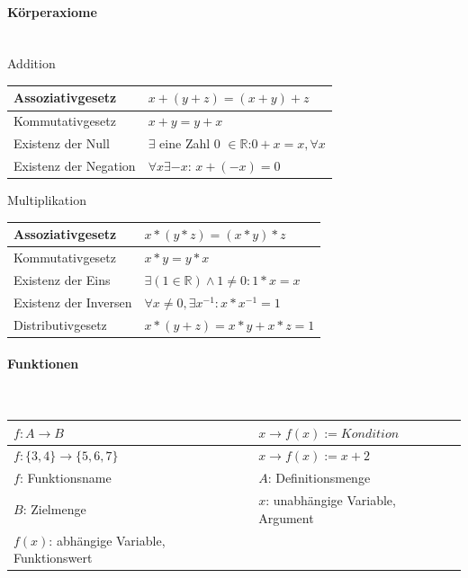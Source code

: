 \paragraph{Körperaxiome}\mbox{}\\
\noindent
Addition\linebreak
\begin{tabularx}{\columnwidth}{@{}X|X@{}}
    \hline
    Assoziativgesetz      & $x+(y+z) = (x+y)+z$                                                  \\ \hline
    Kommutativgesetz      & $x+y = y+x$                                                          \\ \hline
    Existenz der Null     & $\exists$ eine Zahl 0 $\in \mathbb{R}$:\linebreak $0+x=x, \forall x$ \\ \hline
    Existenz der Negation & $\forall x\exists -x$: $x+(-x) = 0$                                  \\ \hline
\end{tabularx}
\vspace{1mm}
\noindent
Multiplikation\linebreak
\begin{tabularx}{\columnwidth}{@{}X|X@{}}
    \hline
    Assoziativgesetz      & $x*(y*z) = (x*y)*z$                               \\ \hline
    Kommutativgesetz      & $x*y = y*x$                                       \\ \hline
    Existenz der Eins     & $\exists (1\in \mathbb{R}) \land 1 \neq 0: 1*x=x$ \\ \hline
    Existenz der Inversen & $\forall x \neq 0, \exists x^{-1}: x*x^{-1}=1$                   \\ \hline
    Distributivgesetz     & $x*(y+z) = x*y + x*z = 1$                                                  \\ \hline
\end{tabularx}
\vspace{1mm}

\paragraph{Funktionen}\mbox{}\\
\begin{tabularx}{\columnwidth}{@{}X|X@{}}
    \hline
    $f : A \rightarrow B$               & $x \rightarrow f(x) := Kondition$   \\ \hline
    $f : \{3,4\} \rightarrow \{5,6,7\}$ & $x \rightarrow f(x) := x + 2$       \\ \hline
    $f$: Funktionsname                  & $A$: Definitionsmenge               \\ \hline
    $B$: Zielmenge                      & $x$: unabhängige Variable, Argument \\ \hline
    $f(x)$: abhängige Variable, Funktionswert                                 \\ \hline
\end{tabularx}
\vspace{1mm}